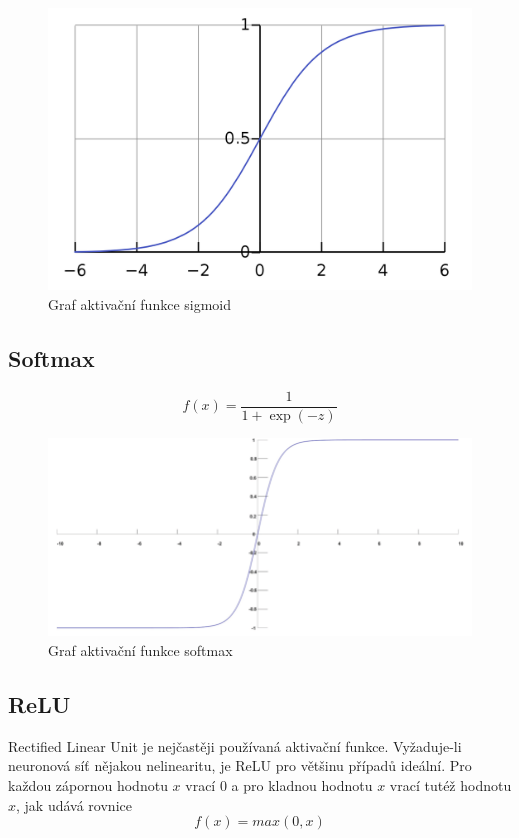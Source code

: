 \begin{figure}[H]
    \centering
    \includegraphics[scale=0.18]{obrazky-figures/sigmoid.png}
    \caption{\label{fig:sigmoid}Graf aktivační funkce sigmoid}
\end{figure}



\subsection*{Softmax}
\begin{equation}
  f(x) = \frac{1}{1+\exp(-z)}
\end{equation}


\begin{figure}[H]
    \centering
    \includegraphics[scale=0.35]{obrazky-figures/softmax.png}
    \caption{\label{fig:softmax}Graf aktivační funkce softmax}
\end{figure}




\subsection*{ReLU}
\label{relu}
Rectified Linear Unit je nejčastěji používaná aktivační funkce. Vyžaduje-li neuronová síť nějakou nelinearitu, je ReLU pro většinu případů ideální. Pro každou zápornou hodnotu $x$ vrací $0$ a pro kladnou hodnotu $x$ vrací tutéž hodnotu $x$, jak udává rovnice 
\begin{equation}
   f(x)=max(0,x)
\end{equation}

